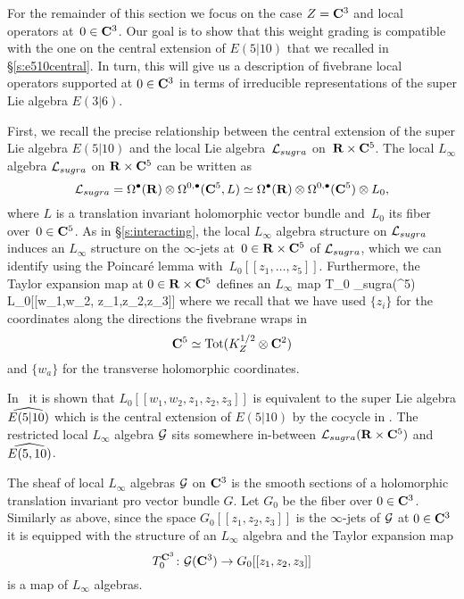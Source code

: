 For the remainder of this section we focus on the case $Z = \C^3$ and local operators at~$0 \in \C^3$. 
Our goal is to show that this weight grading is compatible with the one on the central extension of $E(5|10)$ that we recalled in \S \ref{s:e510central}. 
In turn, this will give us a description of fivebrane local operators supported at $0 \in \C^3$ in terms of irreducible representations of the super Lie algebra $E(3|6)$. 

\parsec[]

First, we recall the precise relationship between the central extension of the super Lie algebra $E(5|10)$ and the local Lie algebra~$\cL_{sugra}$ on~$\R \times \C^5$.
The local $L_\infty$ algebra $\cL_{sugra}$ on $\R \times \C^5$ can be written as 
\[
\cL_{sugra} = \Omega^\bu(\R) \otimes \Omega^{0,\bu}(\C^5, L) \simeq \Omega^\bu(\R) \otimes \Omega^{0,\bu}(\C^5) \otimes L_0 ,
\]
where $L$ is a translation invariant holomorphic vector bundle and~$L_0$ its fiber over~$0 \in \C^5$.
As in \S \ref{s:interacting}, the local $L_\infty$ algebra structure on $\cL_{sugra}$ induces an $L_\infty$ structure on the $\infty$-jets at~$0 \in \R \times \C^5$ of $\cL_{sugra}$, which we can identify using the Poincar\'e lemma with~$L_0[[z_1,\ldots,z_5]]$.
Furthermore, the Taylor expansion map at $0 \in \R \times \C^5$ defines an $L_\infty$ map
\beqn
T_0 \colon \cL_{sugra}(\R \times \C^5) \to L_0[[w_1,w_2, z_1,z_2,z_3]] 
\eeqn
where we recall that we have used $\{z_i\}$ for the coordinates along the directions the fivebrane wraps in 
\[
\C^5 \simeq {\rm Tot}(K^{1/2}_Z \otimes \C^2)
\]
and $\{w_a\}$ for the transverse holomorphic coordinates. 

In~\cite{RSW} it is shown that $L_0[[w_1,w_2, z_1,z_2,z_3]]$ is equivalent to the super Lie algebra $\Hat{E(5|10)}$ which is the central extension of $E(5|10)$ by the cocycle in . 
The restricted local $L_\infty$ algebra $\cG$ sits somewhere in-between $\cL_{sugra}(\R \times \C^5)$ and $\Hat{E(5,10)}$. 

The sheaf of local $L_\infty$ algebras $\cG$ on $\C^3$ is the smooth sections of a holomorphic translation invariant pro vector bundle $G$. 
Let $G_0$ be the fiber over $0 \in \C^3$. 
Similarly as above, since the space $G_0[[z_1,z_2,z_3]]$ is the $\infty$-jets of $\cG$ at $0 \in \C^3$ it is equipped with the structure of an $L_\infty$ algebra and the Taylor expansion map 
\[
T_0^{\C^3} \colon \cG(\C^3) \to G_0[[z_1,z_2,z_3]] 
\]
is a map of $L_\infty$ algebras. 

